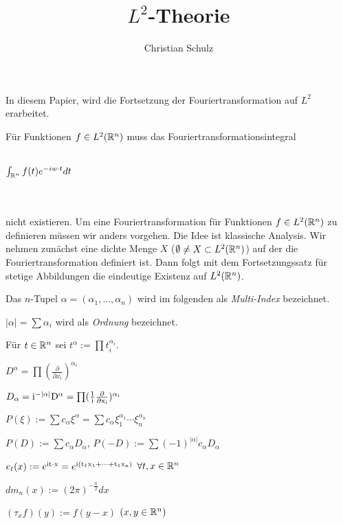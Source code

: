 \documentclass{article}
\title{$L^2$-Theorie}
\author{Christian Schulz}
\def\ie{\rm i}
\begin{document}
\maketitle

In diesem Papier, wird die Fortsetzung der Fouriertransformation auf $L^2$ erarbeitet. 
\begin{motivation}
Für Funktionen $f \in L^2(\mathbb{R}^n)$ muss das Fouriertransformationsintegral \\ \\
\centerline{$\int_{\mathbb{R}^n}f(t) e^{-iw \cdot t} dt$} \\ \\
nicht existieren. Um eine Fouriertransformation für Funktionen $f \in  L^2(\mathbb{R}^n)$ zu definieren müssen wir anders vorgehen.
Die Idee ist klassische Analysis. Wir nehmen zunächst eine dichte Menge $X$ ($\emptyset \neq X \subset L^2(\mathbb{R}^n)$) auf der die
Fouriertransformation definiert ist. Dann folgt mit dem Fortsetzungssatz für stetige Abbildungen die eindeutige Existenz auf $L^2(\mathbb{R}^n)$. \\
\end{motivation}

\begin{definition}
\begin{liste}
\item Das $n$-Tupel $\alpha = (\alpha_1, \dots, \alpha_n)$ wird im folgenden als \emph{Multi-Index} bezeichnet.
\item $|\alpha| = \sum \alpha_i$ wird als \emph{Ordnung} bezeichnet.
\item Für $ t \in \mathbb{R}^n$ sei $t^{\alpha} := \prod t_i^{\alpha_i}$.
\item $D^{\alpha} = \prod (\frac{\partial}{\partial x_i})^{\alpha_i}$
\item $D_{\alpha} = \ie^{-|\alpha|}D^{\alpha} =\prod (\frac{1}{i} \frac{\partial}{\partial x_i})^{\alpha_i}$
\item $P(\xi) := \sum c_{\alpha} \xi^{\alpha} = \sum c_{\alpha} \xi_1^{\alpha_1} \cdots \xi_n^{\alpha_n}$
\item $P(D) := \sum c_{\alpha} D_{\alpha}$, $P(-D) := \sum (-1)^{|\alpha|} c_{\alpha} D_{\alpha} $
\item $e_t(x) := e^{\ie t \cdot x} = e^{ \ie( t_1x_1 + \cdots + t_1x_n ) }$ $\forall t,x \in \mathbb{R}^n$
\item $dm_n(x) := (2\pi)^{-\frac{n}{2}} dx$
\item $(\tau_x f)(y) := f(y-x)$  $(x,y \in \mathbb{R}^n)$
\end{liste}
\end{definition}
\end{document}
